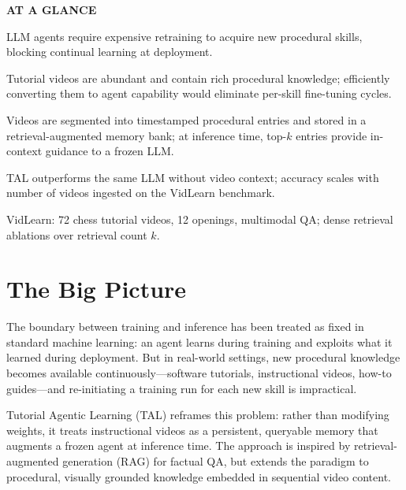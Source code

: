 \documentclass[10pt,twocolumn]{article}
\begin{document}
\begin{mdframed}[backgroundcolor=boxgray,linecolor=rulered,linewidth=1pt,
    innerleftmargin=6pt,innerrightmargin=6pt,
    innertopmargin=6pt,innerbottommargin=6pt]
\textbf{\small AT A GLANCE}\par\vspace{4pt}
\begin{description}[leftmargin=0pt,labelsep=4pt,itemsep=2pt,parsep=0pt,
    font=\small\bfseries]
  \item[Problem:] LLM agents require expensive retraining to acquire new
    procedural skills, blocking continual learning at deployment.
  \item[Why it matters:] Tutorial videos are abundant and contain rich
    procedural knowledge; efficiently converting them to agent capability
    would eliminate per-skill fine-tuning cycles.
  \item[Method:] Videos are segmented into timestamped procedural entries
    and stored in a retrieval-augmented memory bank; at inference time,
    top-$k$ entries provide in-context guidance to a frozen LLM.
  \item[Result:] TAL outperforms the same LLM without video context;
    accuracy scales with number of videos ingested on the VidLearn
    benchmark.
  \item[Evidence:] VidLearn: 72 chess tutorial videos, 12 openings,
    multimodal QA; dense retrieval ablations over retrieval count $k$.
\end{description}
\end{mdframed}

\section{The Big Picture}

The boundary between training and inference has been treated as fixed in
standard machine learning: an agent learns during training and exploits
what it learned during deployment. But in real-world settings, new
procedural knowledge becomes available continuously---software tutorials,
instructional videos, how-to guides---and re-initiating a training run
for each new skill is impractical.

Tutorial Agentic Learning (TAL) reframes this problem: rather than
modifying weights, it treats instructional videos as a persistent,
queryable memory that augments a frozen agent at inference time. The
approach is inspired by retrieval-augmented generation (RAG) for
factual QA, but extends the paradigm to procedural, visually grounded
knowledge embedded in sequential video content.
\end{document}
